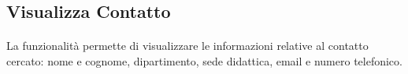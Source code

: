 \subsection{Visualizza Contatto}
\paragraph{}
La funzionalità permette di visualizzare le informazioni relative al contatto cercato: nome e cognome, dipartimento, sede didattica, email e numero telefonico.